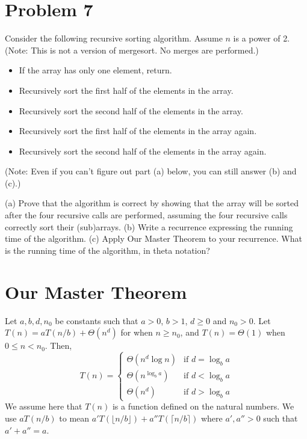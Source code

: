 \documentclass{article}
\begin{document}
\section*{Problem 7}
Consider the following recursive sorting algorithm. Assume $n$ is a power of 2. (Note: This is not a version of mergesort. No merges are performed.)
\begin{itemize}
    \item If the array has only one element, return.
    \item Recursively sort the first half of the elements in the array.
    \item Recursively sort the second half of the elements in the array.
    \item Recursively sort the first half of the elements in the array again.
    \item Recursively sort the second half of the elements in the array again.
\end{itemize}
(Note: Even if you can’t figure out part (a) below, you can still answer (b) and (c).)

(a) Prove that the algorithm is correct by showing that the array will be sorted after the four recursive calls are performed, assuming the four recursive calls correctly sort their (sub)arrays.
(b) Write a recurrence expressing the running time of the algorithm.
(c) Apply Our Master Theorem to your recurrence. What is the running time of the algorithm, in theta notation?


\section*{Our Master Theorem}
\begin{theorem}
Let $a, b, d, n_0$ be constants such that $a > 0$, $b > 1$, $d \ge 0$ and $n_0 > 0$.
Let $T(n) = aT(n/b) + \Theta(n^d)$ for when $n \ge n_0$, and $T(n) = \Theta(1)$ when $0 \le n < n_0$. Then,
\[
T(n) = \begin{cases}
\Theta(n^d \log n) & \text{if } d = \log_b a \\
\Theta(n^{\log_b a}) & \text{if } d < \log_b a \\
\Theta(n^d) & \text{if } d > \log_b a
\end{cases}
\]
We assume here that $T(n)$ is a function defined on the natural numbers. We use $aT(n/b)$ to mean $a'T(\lfloor n/b \rfloor) + a''T(\lceil n/b \rceil)$ where $a', a'' > 0$ such that $a' + a'' = a$.
\end{theorem}
\end{document}
